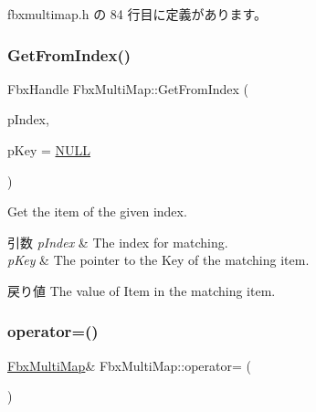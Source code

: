  fbxmultimap.\+h の 84 行目に定義があります。

\mbox{\label{class_fbx_multi_map_a335ac1a6e65c336cdcb06cb425bec932}} 
\subsubsection{\texorpdfstring{Get\+From\+Index()}{GetFromIndex()}}
{\footnotesize\ttfamily Fbx\+Handle Fbx\+Multi\+Map\+::\+Get\+From\+Index (\begin{DoxyParamCaption}\item[{int}]{p\+Index,  }\item[{Fbx\+Handle $\ast$}]{p\+Key = {\ttfamily \hyperlink{fbxarch_8h_a070d2ce7b6bb7e5c05602aa8c308d0c4}{N\+U\+LL}} }\end{DoxyParamCaption})}

Get the item of the given index. 
\begin{DoxyParams}{引数}
{\em p\+Index} & The index for matching. \\
\hline
{\em p\+Key} & The pointer to the Key of the matching item. \\
\hline
\end{DoxyParams}
\begin{DoxyReturn}{戻り値}
The value of Item in the matching item. 
\end{DoxyReturn}
\mbox{\label{class_fbx_multi_map_a0ac91f5605bff211cce31dc46aa97a92}} 
\subsubsection{\texorpdfstring{operator=()}{operator=()}}
{\footnotesize\ttfamily \hyperlink{class_fbx_multi_map}{Fbx\+Multi\+Map}\& Fbx\+Multi\+Map\+::operator= (\begin{DoxyParamCaption}\item[{const \hyperlink{class_fbx_multi_map}{Fbx\+Multi\+Map} \&}]{ }\end{DoxyParamCaption})}

\mbox{\label{class_fbx_multi_map_a373841e60d39a284ea1bc33df94627e7}} 
